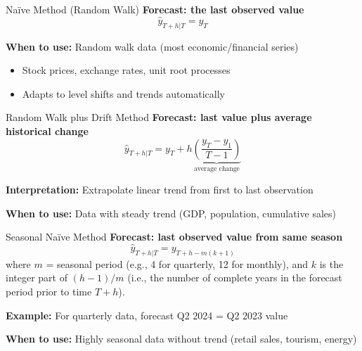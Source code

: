 \documentclass[11pt]{beamer}
\begin{document}
\begin{frame}{Naïve Method (Random Walk)}
	\textbf{Forecast: the last observed value}
	\begin{equation}
		\hat{y}_{T+h|T} = y_T
	\end{equation}


	\vspace{0.5cm}
	\textbf{When to use:} Random walk data (most economic/financial series)
	\begin{itemize}
		\item Stock prices, exchange rates, unit root processes
		\item Adapts to level shifts and trends automatically
	\end{itemize}
\end{frame}

\begin{frame}{Random Walk plus Drift Method}
	\textbf{Forecast: last value plus average historical change}
	\begin{equation}
		\hat{y}_{T+h|T} = y_T + h \underbrace{\left(\frac{y_T - y_1}{T-1}\right)}_{\text{average change}}
	\end{equation}

	\vspace{0.5cm}
	\textbf{Interpretation:} Extrapolate linear trend from first to last observation

	\vspace{0.5cm}

	\vspace{0.5cm}
	\textbf{When to use:} Data with steady trend (GDP, population, cumulative sales)
\end{frame}

\begin{frame}{Seasonal Naïve Method}
	\textbf{Forecast: last observed value from same season}
	\begin{equation}
		\hat{y}_{T+h|T} = y_{T+h-m(k+1)}
	\end{equation}
	where $m$ = seasonal period (e.g., 4 for quarterly, 12 for monthly), and $k$ is the integer part of $(h-1)/m$ (i.e., the number of complete years in the forecast period prior to time $T+h$).

	\vspace{0.5cm}
	\textbf{Example:} For quarterly data, forecast Q2 2024 = Q2 2023 value

	\vspace{0.5cm}
	\textbf{When to use:} Highly seasonal data without trend (retail sales, tourism, energy)
\end{frame}
\end{document}
